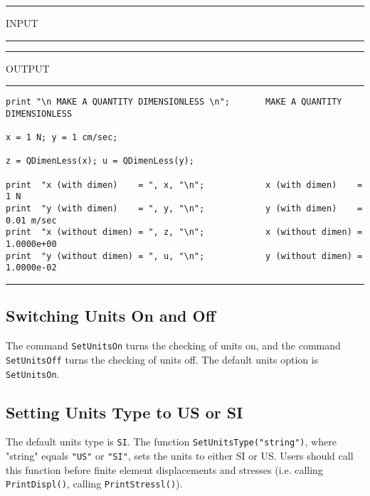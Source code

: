 \vspace{0.20 in}
\begin{footnotesize}
\noindent
\rule{1.2 in}{0.035 in} INPUT \rule{1.2 in}{0.035 in}\hspace{0.1 in}
\rule{1.3 in}{0.035 in} OUTPUT\rule{1.3 in}{0.035 in}
\begin{verbatim}
print "\n MAKE A QUANTITY DIMENSIONLESS \n";       MAKE A QUANTITY DIMENSIONLESS 

x = 1 N; y = 1 cm/sec;

z = QDimenLess(x); u = QDimenLess(y);

print  "x (with dimen)    = ", x, "\n";            x (with dimen)    =         1 N
print  "y (with dimen)    = ", y, "\n";            y (with dimen)    =      0.01 m/sec
print  "x (without dimen) = ", z, "\n";            x (without dimen) =   1.0000e+00 
print  "y (without dimen) = ", u, "\n";            y (without dimen) =   1.0000e-02 
\end{verbatim}
\rule{6.25 in}{0.035 in}
\end{footnotesize}

\subsection{Switching Units On and Off}

\vspace{0.15 in}
\noindent\hspace{0.5 in}
The command {\tt SetUnitsOn} turns the checking of units on,
and the command {\tt SetUnitsOff} turns the checking of units off.
The default units option is {\tt SetUnitsOn}.

\subsection{Setting Units Type to US or SI}

\vspace{0.15 in}
\noindent\hspace{0.5 in}
The default units type is {\tt SI}.
The function {\tt SetUnitsType("string")},
where "string" equals {\tt "US"} or {\tt "SI"},
sets the units to either SI or US.
Users should call this function before finite element displacements and
stresses (i.e. calling {\tt PrintDispl()}, calling {\tt PrintStressl()}).

